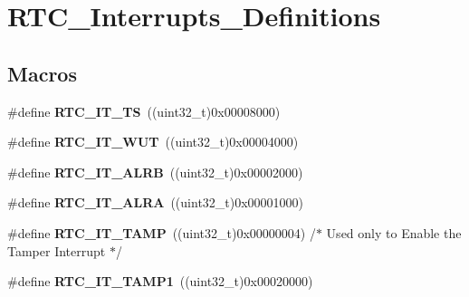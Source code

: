 \hypertarget{group___r_t_c___interrupts___definitions}{\section{R\-T\-C\-\_\-\-Interrupts\-\_\-\-Definitions}
\label{group___r_t_c___interrupts___definitions}
}
\subsection*{Macros}
\begin{DoxyCompactItemize}
\item 
\hypertarget{group___r_t_c___interrupts___definitions_ga2c4632667c515e366a79df6341d5f3d1}{\#define {\bfseries R\-T\-C\-\_\-\-I\-T\-\_\-\-T\-S}~((uint32\-\_\-t)0x00008000)}\label{group___r_t_c___interrupts___definitions_ga2c4632667c515e366a79df6341d5f3d1}

\item 
\hypertarget{group___r_t_c___interrupts___definitions_gadc90686ace99992f4775c0198a1c6591}{\#define {\bfseries R\-T\-C\-\_\-\-I\-T\-\_\-\-W\-U\-T}~((uint32\-\_\-t)0x00004000)}\label{group___r_t_c___interrupts___definitions_gadc90686ace99992f4775c0198a1c6591}

\item 
\hypertarget{group___r_t_c___interrupts___definitions_gaeb47520af65e995ddad232f3a846aba8}{\#define {\bfseries R\-T\-C\-\_\-\-I\-T\-\_\-\-A\-L\-R\-B}~((uint32\-\_\-t)0x00002000)}\label{group___r_t_c___interrupts___definitions_gaeb47520af65e995ddad232f3a846aba8}

\item 
\hypertarget{group___r_t_c___interrupts___definitions_ga0ba352559e4eb6a5430e1254851a0dfb}{\#define {\bfseries R\-T\-C\-\_\-\-I\-T\-\_\-\-A\-L\-R\-A}~((uint32\-\_\-t)0x00001000)}\label{group___r_t_c___interrupts___definitions_ga0ba352559e4eb6a5430e1254851a0dfb}

\item 
\hypertarget{group___r_t_c___interrupts___definitions_gada511402e0227932824cdc95711ebd55}{\#define {\bfseries R\-T\-C\-\_\-\-I\-T\-\_\-\-T\-A\-M\-P}~((uint32\-\_\-t)0x00000004) /$\ast$ Used only to Enable the Tamper Interrupt $\ast$/}\label{group___r_t_c___interrupts___definitions_gada511402e0227932824cdc95711ebd55}

\item 
\hypertarget{group___r_t_c___interrupts___definitions_gaae1bc95e46b6951e45c4d857a6701a8a}{\#define {\bfseries R\-T\-C\-\_\-\-I\-T\-\_\-\-T\-A\-M\-P1}~((uint32\-\_\-t)0x00020000)}\label{group___r_t_c___interrupts___definitions_gaae1bc95e46b6951e45c4d857a6701a8a}


\end{DoxyCompactItemize}
